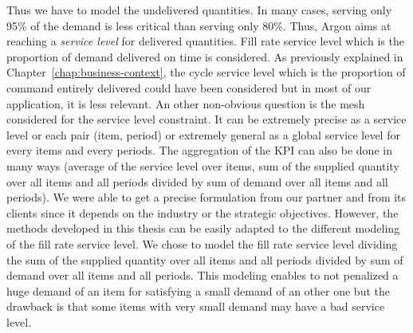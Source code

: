 Thus we have to model the undelivered quantities. In many cases, serving only 95\% of the demand is less critical than serving only 80\%. Thus, Argon aims at reaching a \emph{service level} for delivered quantities. Fill rate service level which is the proportion of demand delivered on time is considered. As previously explained in Chapter~\ref{chap:business-context}, the cycle service level which is the proportion of command entirely delivered could have been considered but in most of our application, it is less relevant. An other non-obvious question is the mesh considered for the service level constraint. It can be extremely precise as a service level or each pair (item, period) or extremely general as a global service level for every items and every periods. The aggregation of the KPI can also be done in many ways (\eg average of the service level over items, sum of the supplied quantity over all items and all periods divided by sum of demand over all items and all periods). We were able to get a precise formulation from our partner and from its clients since it depends on the industry or the strategic objectives. However, the methods developed in this thesis can be easily adapted to the different modeling of the fill rate service level. We chose to model the fill rate service level dividing the sum of the supplied quantity over all items and all periods divided by sum of demand over all items and all periods. This modeling enables to not penalized a huge demand of an item for satisfying a small demand of an other one but the drawback is that some items with very small demand may have a bad service level.

